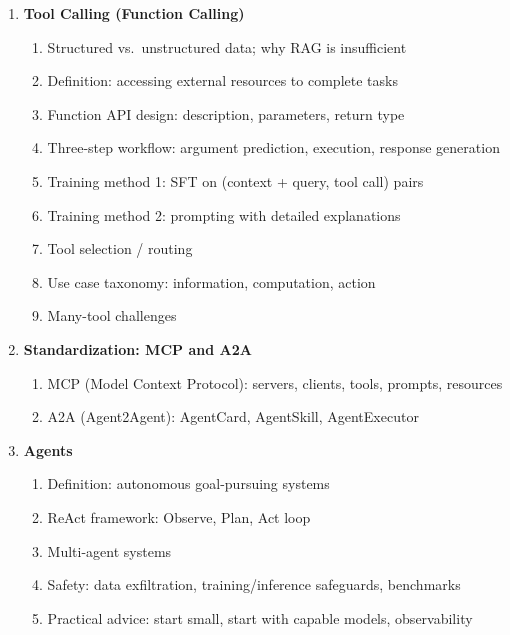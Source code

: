 \documentclass[11pt, a4paper]{article}
\begin{document}
\begin{enumerate}[label=\textbf{\arabic*.}, leftmargin=2em]
  \item \textbf{Tool Calling (Function Calling)}
    \begin{enumerate}[label=\arabic{enumi}.\arabic*]
      \item Structured vs.\ unstructured data; why RAG is insufficient
      \item Definition: accessing external resources to complete tasks
      \item Function API design: description, parameters, return type
      \item Three-step workflow: argument prediction, execution, response generation
      \item Training method 1: SFT on (context + query, tool call) pairs
      \item Training method 2: prompting with detailed explanations
      \item Tool selection / routing
      \item Use case taxonomy: information, computation, action
      \item Many-tool challenges
    \end{enumerate}

  \item \textbf{Standardization: MCP and A2A}
    \begin{enumerate}[label=\arabic{enumi}.\arabic*]
      \item MCP (Model Context Protocol): servers, clients, tools, prompts, resources
      \item A2A (Agent2Agent): AgentCard, AgentSkill, AgentExecutor
    \end{enumerate}

  \item \textbf{Agents}
    \begin{enumerate}[label=\arabic{enumi}.\arabic*]
      \item Definition: autonomous goal-pursuing systems
      \item ReAct framework: Observe, Plan, Act loop
      \item Multi-agent systems
      \item Safety: data exfiltration, training/inference safeguards, benchmarks
      \item Practical advice: start small, start with capable models, observability
    \end{enumerate}
\end{enumerate}

\newpage
\end{document}
